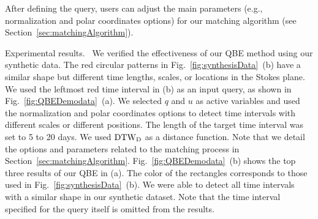 After defining the query, users can adjust the main parameters (e.g., normalization and polar coordinates options) for our matching algorithm (see Section~\ref{sec:matchingAlgorithm}). 
%

\textsf{Experimental results.\ } We verified the effectiveness of our QBE method using our synthetic data.
The red circular patterns in Fig.~\ref{fig:synthesisData}~(b) have a similar shape but different time lengths, scales, or locations in the Stokes plane.
We used the leftmost red time interval in (b) as an input query, as shown in Fig.~\ref{fig:QBEDemodata}~(a).
We selected $q$ and $u$ as active variables and used the normalization and polar coordinates options to detect time intervals with different scales or different positions.
The length of the target time interval was set to 5 to 20 days.
We used $\rm{DTW}_{\rm D}$ as a distance function.
Note that we detail the options and parameters related to the matching process in Section~\ref{sec:matchingAlgorithm}.
Fig.~\ref{fig:QBEDemodata}~(b) shows the top three results of our QBE in (a).
The color of the rectangles corresponds to those used in Fig.~\ref{fig:synthesisData}~(b).
We were able to detect all time intervals with a similar shape in our synthetic dataset.
Note that the time interval specified for the query itself is omitted from the results.


